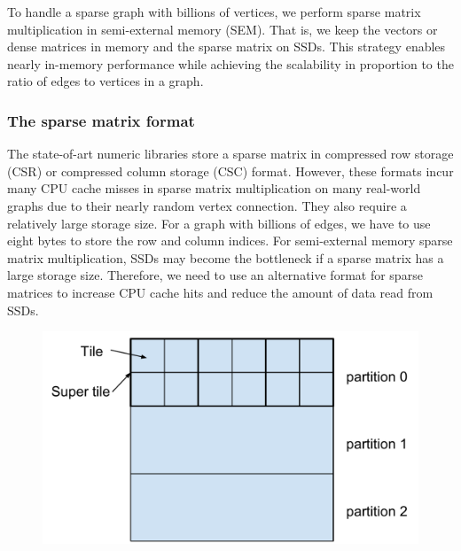 To handle a sparse graph with billions of vertices, we perform sparse matrix
multiplication in semi-external memory (SEM). That is, we keep the vectors
or dense matrices in memory and the sparse
matrix on SSDs. This strategy enables nearly in-memory performance while achieving
the scalability in proportion to the ratio of edges to vertices in a graph.

\subsubsection{The sparse matrix format}
The state-of-art numeric libraries store a sparse matrix in compressed row storage
(CSR) or compressed column storage (CSC) format. However, these formats incur
many CPU cache misses in sparse matrix multiplication on many real-world graphs
due to their nearly random vertex connection. They also require a relatively
large storage size. For a graph with billions of edges, we have to use eight
bytes to store the row and column indices. For semi-external memory sparse
matrix multiplication, SSDs may become the bottleneck if a sparse matrix has
a large storage size.
Therefore, we need to use an alternative format for sparse matrices to increase
CPU cache hits and reduce the amount of data read from SSDs.

\begin{figure}
\centering
\includegraphics[scale=0.3]{./sparse_mat.pdf}
\vspace{-5pt}
\caption{}
\vspace{-5pt}
\label{sparse_mat}
\end{figure}

